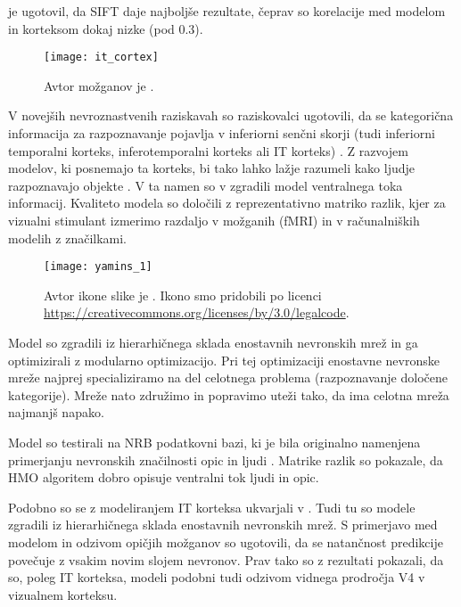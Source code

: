  je ugotovil, da SIFT daje najboljše rezultate, čeprav so korelacije med modelom in korteksom dokaj nizke (pod \num{0.3}). 

\begin{figure}[!htbp]
	\centering
	\texttt{[image: it\_cortex]}
	\caption{Avtor možganov je \cite{brain}.}
\end{figure}

V novejših nevroznastvenih raziskavah so raziskovalci ugotovili, da se kategorična informacija za razpoznavanje pojavlja v inferiorni senčni skorji (tudi inferiorni temporalni korteks, inferotemporalni korteks ali IT korteks) \cite{yamins2013hierarchical}. Z razvojem modelov, ki posnemajo ta korteks, bi tako lahko lažje razumeli kako ljudje razpoznavajo objekte \cite{yamins2013hierarchical}. V ta namen so v \cite{yamins2013hierarchical} zgradili model ventralnega toka informacij. Kvaliteto modela so določili z reprezentativno matriko razlik, kjer za vizualni stimulant izmerimo razdaljo v možganih (fMRI) in v računalniških modelih z značilkami.


\begin{figure}[!htbp]
	\centering
	\texttt{[image: yamins\_1]}
	\caption{Avtor ikone slike je \cite{imageicon}. Ikono smo pridobili po licenci \url{https://creativecommons.org/licenses/by/3.0/legalcode}.}
\end{figure}

Model so zgradili iz hierarhičnega sklada enostavnih nevronskih mrež in ga optimizirali z modularno optimizacijo. Pri tej optimizaciji enostavne nevronske mreže najprej specializiramo na del celotnega problema (razpoznavanje določene kategorije). Mreže nato združimo in popravimo uteži tako, da ima celotna mreža najmanjš napako. 

Model so testirali na NRB podatkovni bazi, ki je bila originalno namenjena primerjanju nevronskih značilnosti opic in ljudi \cite{yamins2013hierarchical}. Matrike razlik so pokazale, da HMO algoritem dobro opisuje ventralni tok ljudi in opic.

Podobno so se z modeliranjem IT korteksa ukvarjali v \cite{yamins2014performance}. Tudi tu so modele zgradili iz hierarhičnega sklada enostavnih nevronskih mrež. S primerjavo med modelom in odzivom opičjih možganov so ugotovili, da se natančnost predikcije povečuje z vsakim novim slojem nevronov. Prav tako so z rezultati pokazali, da so, poleg IT korteksa, modeli podobni tudi odzivom vidnega prodročja V4 v vizualnem korteksu.

